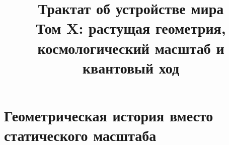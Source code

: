 \documentclass[12pt,a4paper]{report}
\title{Трактат об устройстве мира\\
Том X: растущая геометрия,\\
космологический масштаб и квантовый ход}
\author{}
\date{}
\theoremstyle{remark}
\begin{document}
\hypersetup{pageanchor=false}
\maketitle
\clearpage
\hypersetup{pageanchor=true}
\setcounter{page}{1}
\tableofcontents
\clearpage
{}

\part{Геометрическая история вместо статического масштаба}

























\end{document}
